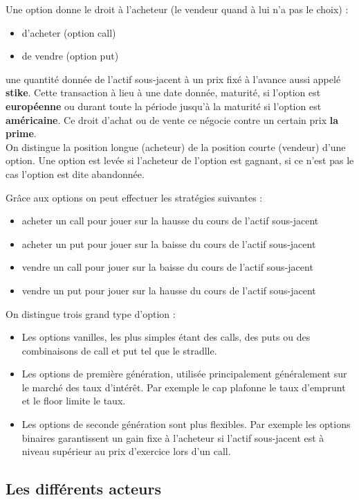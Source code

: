 Une option donne le droit à l'acheteur (le vendeur quand à lui n'a pas le choix) :
\begin{itemize}
\item d'acheter (option call)
\item de vendre (option put) 
\end{itemize}

une quantité donnée de l'actif sous-jacent à un prix fixé à l'avance aussi appelé \textbf{stike}. Cette transaction à lieu à une date donnée, maturité, si l'option est \textbf{européenne} ou durant toute la période jusqu'à la maturité si l'option est \textbf{américaine}. Ce droit d'achat ou de vente ce négocie contre un certain prix \textbf{la prime}. \\

On distingue la position longue (acheteur) de la position courte (vendeur) d'une option. Une option est levée si l'acheteur de l'option est gagnant, si ce n'est pas le cas l'option est dite abandonnée.

Grâce aux options on peut effectuer les stratégies suivantes : 
\begin{itemize}
\item acheter un call pour jouer sur la hausse du cours de l'actif sous-jacent
\item acheter un put pour jouer sur la baisse du cours de l'actif sous-jacent
\item vendre un call pour jouer sur la baisse du cours de l'actif sous-jacent
\item vendre un put pour jouer sur la hausse du cours de l'actif sous-jacent
\end{itemize}

On distingue trois grand type d'option :
\begin{itemize}
\item Les options vanilles, les plus simples étant des calls, des puts ou des combinaisons de call et put tel que le stradlle.
\item Les options de première génération, utilisée principalement généralement sur le marché des taux d'intérêt. Par exemple le cap plafonne le taux d'emprunt et le floor limite le taux. 
\item Les options de seconde génération sont plus flexibles. Par exemple les options binaires garantissent un gain fixe à l'acheteur si l'actif sous-jacent est à niveau supérieur au prix d'exercice lors d'un call. 
\end{itemize}

\subsection{Les différents acteurs}

